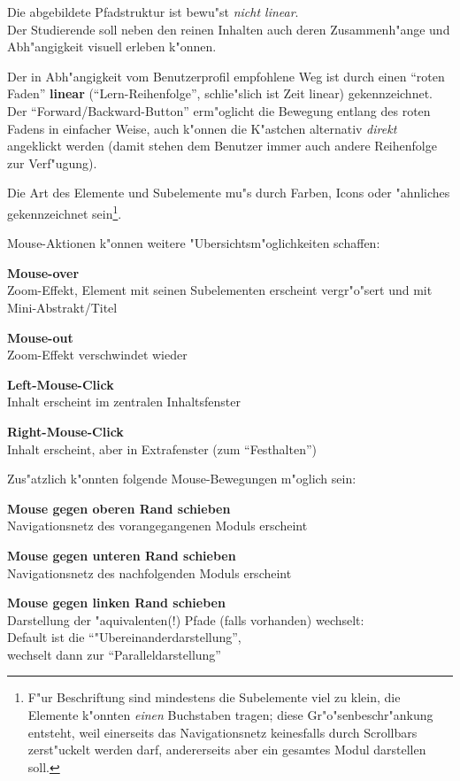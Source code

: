 Die abgebildete Pfadstruktur ist bewu"st \emph{nicht linear}.\\
Der Studierende soll neben den reinen Inhalten auch deren
Zusammenh"ange und Abh"angigkeit visuell erleben k"onnen.

Der in Abh"angigkeit vom Benutzerprofil empfohlene Weg ist durch einen
``roten Faden'' \textbf{linear} (``Lern-Reihenfolge'', schlie"slich
ist Zeit linear) gekennzeichnet.\\ 
Der ``Forward/Backward-Button'' erm"oglicht die Bewegung entlang des
roten Fadens in einfacher Weise, 
auch k"onnen die K"astchen alternativ \textit{direkt} angeklickt werden
(damit stehen dem Benutzer immer auch andere Reihenfolge zur 
Verf"ugung).

Die Art des Elemente und Subelemente mu"s durch Farben, Icons oder
"ahnliches gekennzeichnet sein\footnote{F"ur Beschriftung sind
mindestens die Subelemente viel zu klein, die Elemente k"onnten
\textit{einen} Buchstaben tragen; diese Gr"o"senbeschr"ankung
entsteht, weil einerseits das Navigationsnetz keinesfalls durch
Scrollbars zerst"uckelt werden darf, andererseits aber ein gesamtes
Modul darstellen soll.}.

Mouse-Aktionen k"onnen weitere "Ubersichtsm"oglichkeiten schaffen:

\begin{list_sabina}
        \item \textbf{Mouse-over}\\
        Zoom-Effekt, Element mit seinen Subelementen erscheint
	vergr"o"sert und mit Mini-Abstrakt/Titel
        \item \textbf{Mouse-out}\\
        Zoom-Effekt verschwindet wieder
        \item \textbf{Left-Mouse-Click}\\
	Inhalt erscheint im zentralen Inhaltsfenster
        \item \textbf{Right-Mouse-Click}\\
	Inhalt erscheint, aber in Extrafenster (zum ``Festhalten'')
\end{list_sabina}


Zus"atzlich k"onnten folgende Mouse-Bewegungen m"oglich sein:

\begin{list_sabina}
        \item \textbf{Mouse gegen oberen Rand schieben}\\
        Navigationsnetz des vorangegangenen Moduls erscheint 
        \item \textbf{Mouse gegen unteren Rand schieben}\\
        Navigationsnetz des nachfolgenden Moduls erscheint
        \item \textbf{Mouse gegen linken Rand schieben}\\
        Darstellung der "aquivalenten(!) Pfade (falls vorhanden) 
	wechselt:\\
	Default ist die ``"Ubereinanderdarstellung'',\\
	wechselt dann zur ``Paralleldarstellung''
\end{list_sabina}

